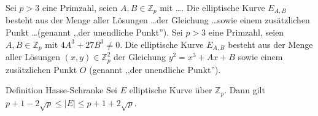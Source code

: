 \documentclass[avery5371, frame]{flashcards}
\begin{document}
\begin{flashcard}{Sei $p >3$ eine Primzahl, seien $A,B\in\mathbb{Z}_p$ mit \dots. Die elliptische Kurve $E_{A,B}$ besteht aus der Menge aller Lösungen \dots der Gleichung \dots sowie einem zusätzlichen Punkt \dots (genannt ,,der unendliche Punkt'').}
    Sei $p >3$ eine Primzahl, seien $A,B\in\mathbb{Z}_p$ mit $4A^3+ 27B^3 \not= 0$. Die elliptische Kurve $E_{A,B}$ besteht aus der Menge aller Lösungen $(x,y)\in\mathbb{Z}^2_p$ der Gleichung $y^2=x^3+Ax+B$ sowie einem zusätzlichen Punkt $O$ (genannt ,,der unendliche Punkt'').
\end{flashcard}

\begin{flashcard}{Definition Hasse-Schranke}
    Sei $E$ elliptische Kurve über $\mathbb{Z}_p$. Dann gilt $p+ 1- 2\sqrt{p}\leq |E|\leq p+1 + 2\sqrt{p}$.
\end{flashcard}
\end{document}
